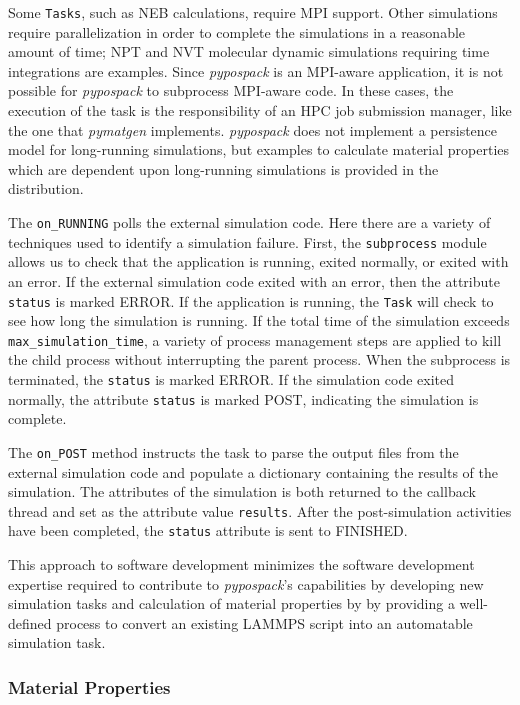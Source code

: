 Some \verb|Tasks|, such as NEB calculations, require MPI support.  Other simulations require parallelization in order to complete the simulations in a reasonable amount of time; NPT and NVT molecular dynamic simulations requiring time integrations are examples.
Since \emph{pypospack} is an MPI-aware application, it is not possible for \emph{pypospack} to subprocess MPI-aware code.  In these cases, the execution of the task is the responsibility of an HPC job submission manager, like the one that \emph{pymatgen} implements.  \emph{pypospack} does not implement a persistence model for long-running simulations, but examples to calculate material properties which are dependent upon long-running simulations is provided in the distribution.

The \verb|on_RUNNING| polls the external simulation code.  Here there are a variety of techniques used to identify a simulation failure.  First, the \verb|subprocess| module allows us to check that the application is running, exited normally, or exited with an error.  If the external simulation code exited with an error, then the attribute \verb|status| is marked ERROR.    If the application is running, the \verb|Task| will check to see how long the simulation is running. If the total time of the simulation exceeds \verb|max_simulation_time|, a variety of process management steps are applied to kill the child process without interrupting the parent process.  When the subprocess is terminated, the \verb|status| is marked ERROR.  If the simulation code exited normally, the attribute \verb|status| is marked POST, indicating the simulation is complete.

The \verb|on_POST| method instructs the task to parse the output files from the external simulation code and populate a dictionary containing the results of the simulation.  The attributes of the simulation is both returned to the callback thread and set as the attribute value \verb|results|.  After the post-simulation activities have been completed, the \verb|status| attribute is sent to FINISHED.

This approach to software development minimizes the software development expertise required to contribute to \emph{pypospack}'s capabilities by developing new simulation tasks and calculation of material properties by by providing a well-defined process to convert an existing LAMMPS script into an automatable simulation task.

\subsubsection{Material Properties}

